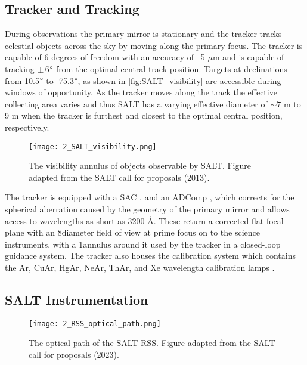\subsection{Tracker and Tracking}

During observations the primary mirror is stationary and the tracker tracks celestial objects across the sky by moving along the primary focus. The tracker is capable of 6 degrees of freedom with an accuracy of ~5 $\mu$m and is capable of tracking $\pm\,$6$\degree$ from the optimal central track position. Targets at declinations from 10.5$\degree$ to -75.3$\degree$, as shown in \autoref{fig:SALT_visibility} are accessible during windows of opportunity. As the tracker moves along the track the effective collecting area varies and thus SALT has a varying effective diameter of $\sim7$ m to 9 m when the tracker is furthest and closest to the optimal central position, respectively.

\begin{figure}[t]
    \centering
    \texttt{[image: 2\_SALT\_visibility.png]}
    \caption{The visibility annulus of objects observable by SALT. Figure adapted from the SALT call for proposals (2013).\protect\footnotemark}
    \label{fig:SALT_visibility}
\end{figure}


The tracker is equipped with a \gls{SAC} \citep{SALT_SAC}, and an \gls{ADComp} \citep{SALT_ADC}, which corrects for the spherical aberration caused by the geometry of the primary mirror and allows access to wavelengths as short as 3200 \AA. These return a corrected flat focal plane with an 8\arcmin diameter field of view at prime focus on to the science instruments, with a 1\arcmin annulus around it used by the tracker in a closed-loop guidance system. The tracker also houses the calibration system which contains the \gls{Ar}, \gls{CuAr}, \gls{HgAr}, \gls{NeAr}, \gls{ThAr}, and \gls{Xe} wavelength calibration lamps \citep{SALT_cal_sys}.

\subsection{SALT Instrumentation} \label{subsec:SALT_instr}

\begin{figure}[t]
    \centering
    \texttt{[image: 2\_RSS\_optical\_path.png]}
    \caption{The optical path of the \gls{SALT} \gls{RSS}. Figure adapted from the SALT call for proposals (2023).\protect\footnotemark}
    \label{fig:RSS_layout}
\end{figure}

